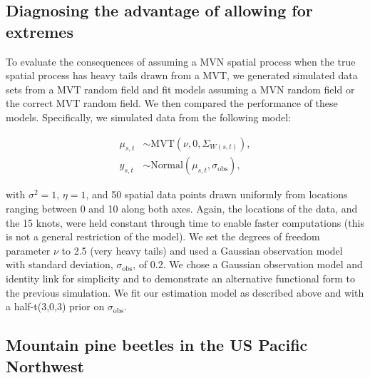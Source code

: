 \documentclass[12pt,english]{article}
\begin{document}
\begin{spacing}{1.3}
\subsection{Diagnosing the advantage of allowing for extremes}

To evaluate the consequences of assuming a MVN spatial process when the
true spatial process has heavy tails drawn from a MVT, we generated simulated
data sets from a MVT random field and fit models assuming a
MVN random field or the
correct MVT random field.
We then compared the performance of these models. Specifically, we
simulated data from the following model:

\begin{align}
  \mu_{s,t} &\sim \mathrm{MVT}\left(\nu, 0, \Sigma_{W(s,t)}\right),\\
  y_{s,t} &\sim \mathrm{Normal} \left(\mu_{s,t}, \sigma_{\mathrm{obs}} \right),
\end{align}

\noindent with $\sigma^2 = 1$, $\eta = 1$, and 50 spatial data points drawn uniformly
from locations ranging between 0 and 10 along both axes. Again, the locations
of the data, and the 15 knots, were held constant through time to enable faster
computations (this is not a general restriction of the model).
We set the degrees of freedom parameter $\nu$ to 2.5 (very heavy tails) and used a
Gaussian observation model with standard deviation, $\sigma_{\mathrm{obs}}$, of
0.2. We chose a Gaussian observation
model and identity link for simplicity and to demonstrate an alternative
functional form to the previous simulation. We fit our estimation model as
described above and with a half-t(3,0,3) prior on $\sigma_{\mathrm{obs}}$.

\subsection{Mountain pine beetles in the US Pacific Northwest}


\end{spacing}
\end{document}
